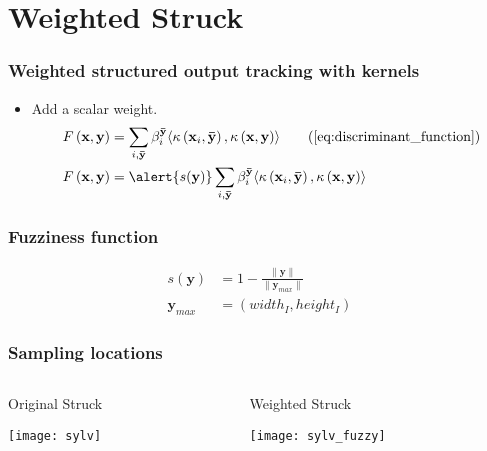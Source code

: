 \section{Weighted Struck}

\begin{frame}
    \frametitle{Weighted structured output tracking with kernels}
    \begin{itemize}
        \item Add a scalar weight.
            \begin{align}
                F\left(\mathbf{x}, \mathbf{y}\right) &= \sum_{i, \mathbf{\bar{y}}} \beta_i^\mathbf{\bar{y}}
                    \langle \kappa\left(\mathbf{x}_i, \mathbf{\bar{y}}\right),
                    \kappa\left(\mathbf{x}, \mathbf{y}\right) \rangle
                    \tag{\ref{eq:discriminant_function}} \\
                F\left(\mathbf{x}, \mathbf{y}\right) &= \alert{s(\mathbf{y})} \sum_{i, \mathbf{\bar{y}}} \beta_i^\mathbf{\bar{y}}
                    \langle \kappa\left(\mathbf{x}_i, \mathbf{\bar{y}}\right),
                    \kappa\left(\mathbf{x}, \mathbf{y}\right) \rangle
            \end{align}
    \end{itemize}
\end{frame}

\begin{frame}
    \frametitle{Fuzziness function}
    \begin{align}
        s(\mathbf{y}) &= 1 - \frac{\|\mathbf{y}\|}{\|\mathbf{y}_{max}\|} \\
        \mathbf{y}_{max} &= (width_I, height_I)
    \end{align}
\end{frame}

\begin{frame}
    \frametitle{Sampling locations}
    \begin{columns}
        \begin{column}{0.5\textwidth}
            Original Struck

            \texttt{[image: sylv]}
        \end{column}
        \begin{column}{0.5\textwidth}
            Weighted Struck

            \texttt{[image: sylv\_fuzzy]}
        \end{column}
    \end{columns}
\end{frame}

